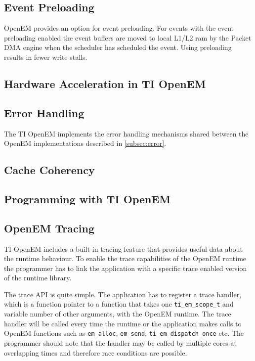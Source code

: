 \subsection{Event Preloading}
OpenEM provides an option for event preloading. For events with the event preloading enabled the event buffers are moved to local L1/L2 ram by the Packet DMA engine  when the scheduler has scheduled the event. Using preloading results in fewer write stalls. \cite{openemwhite}  

\subsection{Hardware Acceleration in TI OpenEM}

\subsection{Error Handling}
The TI OpenEM implements the error handling mechanisms shared between the OpenEM implementations described in \ref{subsec:error}. 

\subsection{Cache Coherency}

\subsection{Programming with TI OpenEM}
\label{subsec:ti_init_layer}

\subsection{OpenEM Tracing}
TI OpenEM includes a built-in tracing feature that provides useful data about the runtime behaviour. To enable the trace capabilities of the OpenEM runtime the programmer has to link the application with a specific trace enabled version of the runtime library. \cite{openemapi}

 The trace API is quite simple. The application has to register a trace handler, which is a function pointer to a function that takes one \texttt{ti\_em\_scope\_t} and variable number of other arguments, with the OpenEM runtime. The trace handler will be called every time the runtime or the application makes calls to OpenEM functions such as \texttt{em\_alloc}, \texttt{em\_send}, \texttt{ti\_em\_dispatch\_once} etc. \cite{openemapi} The programmer should note that the handler may be called by multiple cores at overlapping times and therefore race conditions are possible.

